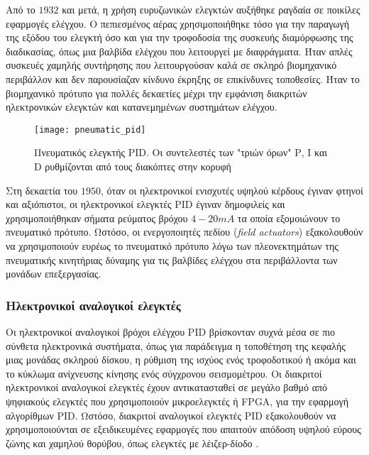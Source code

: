 Από το $1932$ και μετά, η χρήση ευρυζωνικών ελεγκτών αυξήθηκε ραγδαία σε ποικίλες εφαρμογές ελέγχου. Ο πεπιεσμένος αέρας χρησιμοποιήθηκε τόσο για την παραγωγή της εξόδου του ελεγκτή όσο και για την τροφοδοσία της συσκευής διαμόρφωσης της διαδικασίας, όπως μια βαλβίδα ελέγχου που λειτουργεί με διαφράγματα. Ήταν απλές συσκευές χαμηλής συντήρησης που λειτουργούσαν καλά σε σκληρό βιομηχανικό περιβάλλον και δεν παρουσίαζαν κίνδυνο έκρηξης σε επικίνδυνες τοποθεσίες. Ήταν το βιομηχανικό πρότυπο για πολλές δεκαετίες μέχρι την εμφάνιση διακριτών ηλεκτρονικών ελεγκτών και κατανεμημένων συστημάτων ελέγχου.

\begin{figure}[h]
  \centering
  \texttt{[image: pneumatic\_pid]}
  \caption{Πνευματικός ελεγκτής PID. Οι συντελεστές των "τριών όρων" Ρ, Ι και D ρυθμίζονται από τους διακόπτες στην κορυφή}
  \label{fig:pneumatic_pid}
\end{figure}

Στη δεκαετία του $1950$, όταν οι ηλεκτρονικοί ενισχυτές υψηλού κέρδους έγιναν φτηνοί και αξιόπιστοι, οι ηλεκτρονικοί ελεγκτές PID έγιναν δημοφιλείς και χρησιμοποιήθηκαν σήματα ρεύματος βρόχου $4-20 mA$ τα οποία εξομοιώνουν το πνευματικό πρότυπο. Ωστόσο, οι ενεργοποιητές πεδίου (\emph{field actuators}) εξακολουθούν να χρησιμοποιούν ευρέως το πνευματικό πρότυπο λόγω των πλεονεκτημάτων της πνευματικής κινητήριας δύναμης για τις βαλβίδες ελέγχου στα περιβάλλοντα των μονάδων επεξεργασίας.

\subsubsection{Ηλεκτρονικοί αναλογικοί ελεγκτές}
Οι ηλεκτρονικοί αναλογικοί βρόχοι ελέγχου PID βρίσκονταν συχνά μέσα σε πιο σύνθετα ηλεκτρονικά συστήματα, όπως για παράδειγμα η τοποθέτηση της κεφαλής μιας μονάδας σκληρού δίσκου, η ρύθμιση της ισχύος ενός τροφοδοτικού ή ακόμα και το κύκλωμα ανίχνευσης κίνησης ενός σύγχρονου σεισμομέτρου. Οι διακριτοί ηλεκτρονικοί αναλογικοί ελεγκτές έχουν αντικατασταθεί σε μεγάλο βαθμό από ψηφιακούς ελεγκτές που χρησιμοποιούν μικροελεγκτές ή FPGA, για την εφαρμογή αλγορίθμων PID. Ωστόσο, διακριτοί αναλογικοί ελεγκτές PID εξακολουθούν να χρησιμοποιούνται σε εξειδικευμένες εφαρμογές που απαιτούν απόδοση υψηλού εύρους ζώνης και χαμηλού θορύβου, όπως ελεγκτές με λέιζερ-δίοδο \cite{origin11}.


